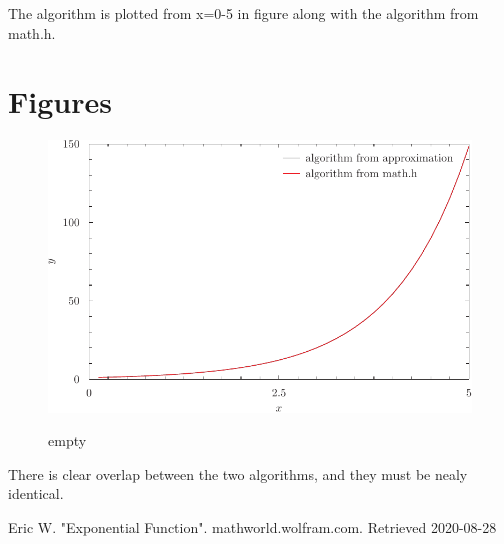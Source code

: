 \documentclass{article}
\begin{document}
The algorithm is plotted from x=0-5 in figure along with the algorithm from math.h. 
\section{Figures}
	\begin{figure}[H]\centering \label{fig:exponential function}
\includegraphics{fig-exp-pyxplot.pdf}
\caption{empty}
	\end{figure}
There is clear overlap between the two algorithms, and they must be nealy identical.

\begin{thebibliography}{9}
 Eric W. "Exponential Function". mathworld.wolfram.com. Retrieved 2020-08-28
\end{thebibliography}
\end{document}
